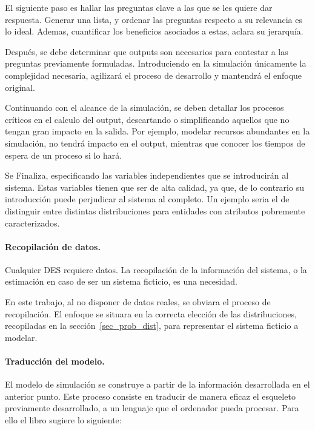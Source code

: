El siguiente paso es hallar las preguntas clave a las que
se les quiere dar respuesta.
Generar una lista, y ordenar las preguntas respecto a su relevancia es lo ideal.
Ademas, cuantificar los beneficios asociados a estas, aclara su jerarquía.

Después, se debe determinar que outputs son necesarios
para contestar a las preguntas previamente formuladas.
Introduciendo en la simulación únicamente la complejidad necesaria,
agilizará el proceso de desarrollo y mantendrá el enfoque original.

Continuando con el alcance de la simulación,
se deben detallar los procesos críticos en el calculo del output,
descartando o simplificando aquellos que no tengan gran impacto en la salida.
Por ejemplo, modelar recursos abundantes en la simulación,
no tendrá impacto en el output,
mientras que conocer los tiempos de espera de un proceso si lo hará.

Se Finaliza, especificando las variables independientes
que se introducirán al sistema.
Estas variables tienen que ser de alta calidad, ya que,
de lo contrario su introducción puede perjudicar al sistema al completo.
Un ejemplo seria el de distinguir entre distintas distribuciones
para entidades con atributos pobremente caracterizados.

\paragraph{Recopilación de datos.}

Cualquier DES requiere datos. La recopilación de la información del sistema,
o la estimación en caso de ser un sistema ficticio, es una necesidad.

En este trabajo, al no disponer de datos reales, se obviara el proceso de recopilación.
El enfoque se situara en la correcta elección de las distribuciones, recopiladas en la sección~\ref{sec_prob_dist}, para representar el sistema ficticio a modelar.

\paragraph{Traducción del modelo.}

El modelo de simulación se construye a partir de la información desarrollada en el anterior punto.
Este proceso consiste en traducir de manera eficaz el esqueleto previamente desarrollado,
a un lenguaje que el ordenador pueda procesar.
Para ello el libro sugiere lo siguiente:

